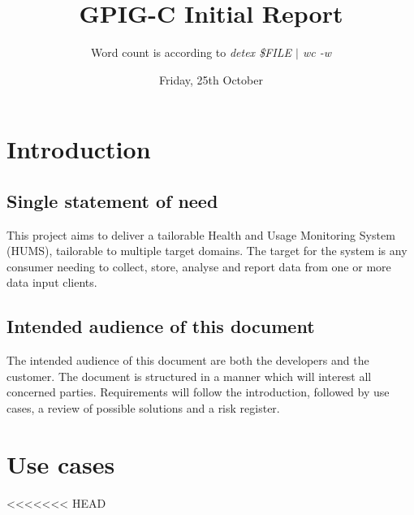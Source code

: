 \documentclass[10pt,a4paper]{article}
\begin{document}
\title{\vspace{-1cm}GPIG-C Initial Report}
\author{Word count is according to
        \textsl{detex \$FILE $\vert$ wc -w}}
\date{Friday, 25th October}
\maketitle
\thispagestyle{fancy} %

\section{Introduction}

\subsection{Single statement of need}
This project aims to deliver a tailorable Health and Usage Monitoring System
(HUMS), tailorable to multiple target domains. The target for the system is any
consumer needing to collect, store, analyse and report data from one or more
data input clients.

\subsection{Intended audience of this document}
The intended audience of this document are both the developers and the customer.
The document is structured in a manner which will interest all concerned
parties. Requirements will follow the introduction, followed by use cases, a
review of possible solutions and a risk register.

\section{Use cases}
<<<<<<< HEAD
\end{document}

